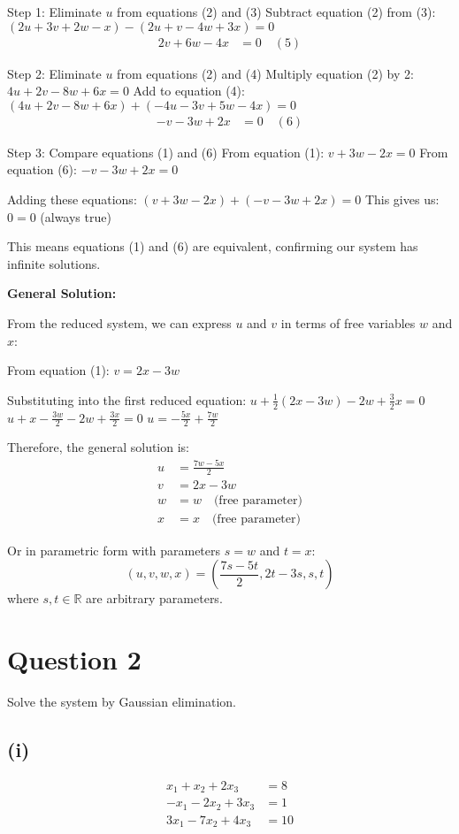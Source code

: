 \documentclass[12pt]{article}
\begin{document}
Step 1: Eliminate $u$ from equations (2) and (3)
Subtract equation (2) from (3): $(2u + 3v + 2w - x) - (2u + v - 4w + 3x) = 0$
\begin{align}
2v + 6w - 4x &= 0 \quad (5)
\end{align}

Step 2: Eliminate $u$ from equations (2) and (4)
Multiply equation (2) by 2: $4u + 2v - 8w + 6x = 0$
Add to equation (4): $(4u + 2v - 8w + 6x) + (-4u - 3v + 5w - 4x) = 0$
\begin{align}
-v - 3w + 2x &= 0 \quad (6)
\end{align}

Step 3: Compare equations (1) and (6)
From equation (1): $v + 3w - 2x = 0$
From equation (6): $-v - 3w + 2x = 0$

Adding these equations: $(v + 3w - 2x) + (-v - 3w + 2x) = 0$
This gives us: $0 = 0$ (always true)

This means equations (1) and (6) are equivalent, confirming our system has infinite solutions.

\textbf{General Solution:}

From the reduced system, we can express $u$ and $v$ in terms of free variables $w$ and $x$:

From equation (1): $v = 2x - 3w$

Substituting into the first reduced equation:
$u + \frac{1}{2}(2x - 3w) - 2w + \frac{3}{2}x = 0$
$u + x - \frac{3w}{2} - 2w + \frac{3x}{2} = 0$
$u = -\frac{5x}{2} + \frac{7w}{2}$

Therefore, the general solution is:
\begin{align*}
u &= \frac{7w - 5x}{2}\\
v &= 2x - 3w\\
w &= w \quad \text{(free parameter)}\\
x &= x \quad \text{(free parameter)}
\end{align*}

Or in parametric form with parameters $s = w$ and $t = x$:
\[
\boxed{(u, v, w, x) = \left(\frac{7s - 5t}{2}, 2t - 3s, s, t\right)}
\]
where $s, t \in \mathbb{R}$ are arbitrary parameters.

\section*{Question 2}
Solve the system by Gaussian elimination.

\subsection*{(i)}
\begin{align*}
x_1 + x_2 + 2x_3 &= 8\\
-x_1 - 2x_2 + 3x_3 &= 1\\
3x_1 - 7x_2 + 4x_3 &= 10
\end{align*}
\end{document}

